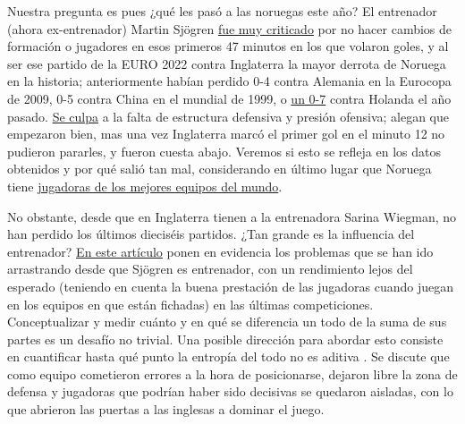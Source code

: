 Nuestra pregunta es pues ¿qué les pasó a las noruegas este año? El entrenador (ahora ex-entrenador) Martin Sjögren 
\href{https://www.nrk.no/sport/massiv-kritikk-mot-sjogren-etter-tidenes-storste-norge-tap-1.16034807}{fue muy 
criticado} por no hacer cambios de formación o jugadores en esos primeros 47 minutos en los que volaron goles, 
y al ser ese partido de la EURO 2022 contra Inglaterra la mayor derrota de Noruega en la historia; anteriormente 
habían perdido 0-4 contra Alemania en la Eurocopa de 2009, 0-5 contra China en el mundial de 1999, o 
\href{https://www.nrk.no/sport/norges-landslag-knust-av-nederland--1.15538927}{un 0-7} contra Holanda el año pasado.
\href{https://www.nrk.no/sport/norge-mareritt-mot-england-i-em_-_-dette-er-direkte-pinlig-1.16034607}{Se culpa} a la 
falta de estructura defensiva y presión ofensiva; alegan que empezaron bien, mas una vez Inglaterra marcó el primer gol en 
el minuto 12 no pudieron pararles, y fueron cuesta abajo. Veremos si esto se refleja en los datos obtenidos y por qué 
salió tan mal, considerando en último lugar que Noruega tiene 
\href{https://www.nrk.no/sport/engelsk-forbauselse_-_-jeg-kan-ikke-helt-tro-det-jeg-nettopp-har-vaert-vitne-til-1.16034919}{
jugadoras de los mejores equipos del mundo}. 

No obstante, desde que en Inglaterra tienen a la entrenadora Sarina Wiegman, no 
han perdido los últimos dieciséis partidos. ¿Tan grande es la influencia del entrenador? 
\href{https://www.nrk.no/sport/hvis-det-er-en-plan_-er-den-usynlig-1.16038718}{En este artículo} ponen en evidencia los problemas 
que se han ido arrastrando desde que Sjögren es entrenador, con un rendimiento lejos del esperado (teniendo en 
cuenta la buena prestación de las jugadoras cuando juegan en los equipos en que están fichadas) en las últimas 
competiciones. Conceptualizar y medir cuánto y en qué se diferencia un todo de la suma de sus partes es un desafío no 
trivial. Una posible dirección para abordar esto consiste en cuantificar hasta qué punto la entropía 
del todo no es aditiva  \cite{whole-different}. Se discute que como equipo cometieron errores a la hora de posicionarse, dejaron libre la zona de 
defensa y jugadoras que podrían haber sido decisivas se quedaron aisladas, con lo que abrieron las puertas a 
las inglesas a dominar el juego. 

